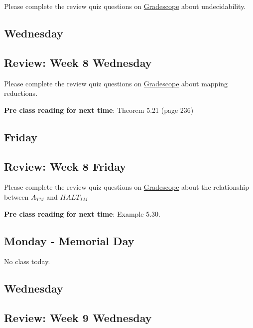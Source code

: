 Please complete the review quiz questions on \href{http://gradescope.com}{Gradescope} about 
undecidability.

\newpage
\subsection*{Wednesday}



\subsection*{Review: Week 8 Wednesday}

Please complete the review quiz questions on \href{http://gradescope.com}{Gradescope} about 
mapping reductions.

{\bf Pre class reading for next time}: Theorem 5.21 (page 236)



\newpage
\subsection*{Friday}



\newpage
\subsection*{Review: Week 8 Friday}


Please complete the review quiz questions on \href{http://gradescope.com}{Gradescope} about 
the relationship between $A_{TM}$ and $HALT_{TM}$

{\bf Pre class reading for next time}: Example 5.30.

\newpage

\subsection*{Monday - Memorial Day}
No class today.

\subsection*{Wednesday}

%
    


\subsection*{Review: Week 9 Wednesday}

